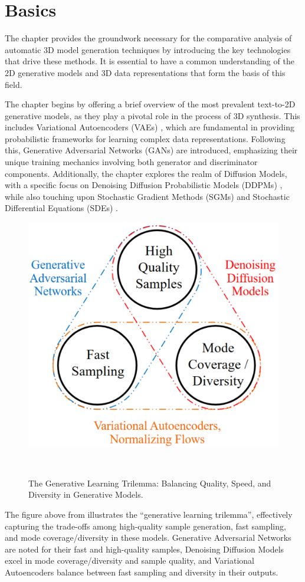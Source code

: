 \chapter{Basics}\label{ch:basics}

The chapter provides the groundwork necessary for the comparative analysis of automatic 3D model generation techniques by introducing the key technologies that drive these methods. It is essential to have a common understanding of the 2D generative models and 3D data representations that form the basis of this field.

The chapter begins by offering a brief overview of the most prevalent text-to-2D generative models, as they play a pivotal role in the process of 3D synthesis. This includes Variational Autoencoders (VAEs) \citep{kingmaVAE,rezendeVAE}, which are fundamental in providing probabilistic frameworks for learning complex data representations. Following this, Generative Adversarial Networks (GANs) \citep{goodfellowGAN} are introduced, emphasizing their unique training mechanics involving both generator and discriminator components. Additionally, the chapter explores the realm of Diffusion Models, with a specific focus on Denoising Diffusion Probabilistic Models (DDPMs) \citep{hoDDPMs,sohlDDPM}, while also touching upon Stochastic Gradient Methods (SGMs) \citep{song2019SGM} and Stochastic Differential Equations (SDEs) \citep{song2020score,song2021maximum}.

\begin{figure}[H]
  \centering
  \includegraphics[width=.4\columnwidth]{figures/BasicTrilemma.png}
  \caption{The Generative Learning Trilemma: Balancing Quality, Speed, and Diversity in Generative Models.~\citep{xiao2022tackling}}~\label{fig:generativeTrilemma}
\end{figure}

The figure above from \citeauthor{xiao2022tackling} illustrates the ``generative learning trilemma'', effectively capturing the trade-offs among high-quality sample generation, fast sampling, and mode coverage/diversity in these models. Generative Adversarial Networks are noted for their fast and high-quality samples, Denoising Diffusion Models excel in mode coverage/diversity and sample quality, and Variational Autoencoders balance between fast sampling and diversity in their outputs.


